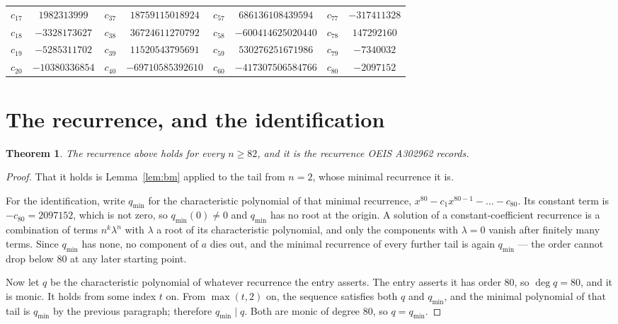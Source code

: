 \documentclass[11pt,a4paper]{article}
\theoremstyle{plain}
\newtheorem{theorem}{Theorem}
\theoremstyle{definition}
\begin{document}
\begin{center}
\begin{tabular}{cccccccc}
$c_{17}$ & $1982313999$ & $c_{37}$ & $18759115018924$ & $c_{57}$ & $686136108439594$ & $c_{77}$ & $-317411328$ \\
$c_{18}$ & $-3328173627$ & $c_{38}$ & $36724611270792$ & $c_{58}$ & $-600414625020440$ & $c_{78}$ & $147292160$ \\
$c_{19}$ & $-5285311702$ & $c_{39}$ & $11520543795691$ & $c_{59}$ & $530276251671986$ & $c_{79}$ & $-7340032$ \\
$c_{20}$ & $-10380336854$ & $c_{40}$ & $-69710585392610$ & $c_{60}$ & $-417307506584766$ & $c_{80}$ & $-2097152$ \\
\end{tabular}
\end{center}

\section{The recurrence, and the identification}

\begin{theorem}
The recurrence above holds for every $n\ge82$, and it is the recurrence OEIS A302962 records.
\end{theorem}

\begin{proof}
That it holds is Lemma~\ref{lem:bm} applied to the tail from $n=2$, whose minimal
recurrence it is.

For the identification, write $q_{\min}$ for the characteristic polynomial of that minimal
recurrence, $x^{80}-c_1x^{80-1}-\dots-c_{80}$. Its constant term is
$-c_{80}=2097152$, which is not zero, so $q_{\min}(0)\neq0$ and $q_{\min}$ has no
root at the origin. A solution of a constant-coefficient recurrence is a combination of terms
$n^{k}\lambda^{n}$ with $\lambda$ a root of its characteristic polynomial, and only the
components with $\lambda=0$ vanish after finitely many terms. Since $q_{\min}$ has none, no
component of $a$ dies out, and the minimal recurrence of every further tail is again
$q_{\min}$ --- the order cannot drop below $80$ at any later starting point.

Now let $q$ be the characteristic polynomial of whatever recurrence the entry asserts. The
entry asserts it has order $80$, so $\deg q=80$, and it is monic. It holds from some
index $t$ on. From $\max(t,2)$ on, the sequence satisfies both $q$ and $q_{\min}$, and
the minimal polynomial of that tail is $q_{\min}$ by the previous paragraph; therefore
$q_{\min}\mid q$. Both are monic of degree $80$, so $q=q_{\min}$.
\end{proof}
\end{document}
